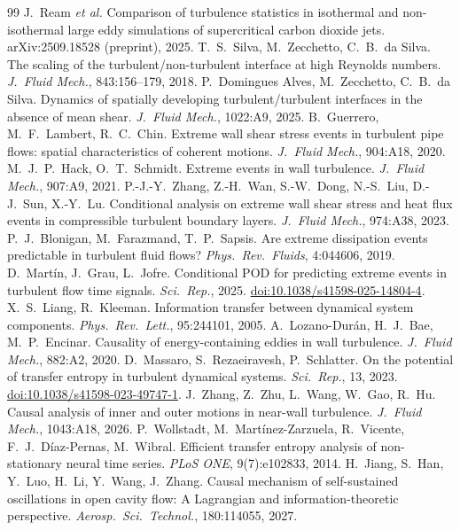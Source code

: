 \documentclass[11pt]{article}
\begin{document}
\begin{thebibliography}{99}
 J.\ Ream \emph{et al.} Comparison of turbulence statistics in isothermal and non-isothermal large eddy simulations of supercritical carbon dioxide jets. arXiv:2509.18528 (preprint), 2025.
 T.\ S.\ Silva, M.\ Zecchetto, C.\ B.\ da Silva. The scaling of the turbulent/non-turbulent interface at high Reynolds numbers. \emph{J.\ Fluid Mech.}, 843:156--179, 2018.
 P.\ Domingues Alves, M.\ Zecchetto, C.\ B.\ da Silva. Dynamics of spatially developing turbulent/turbulent interfaces in the absence of mean shear. \emph{J.\ Fluid Mech.}, 1022:A9, 2025.
 B.\ Guerrero, M.\ F.\ Lambert, R.\ C.\ Chin. Extreme wall shear stress events in turbulent pipe flows: spatial characteristics of coherent motions. \emph{J.\ Fluid Mech.}, 904:A18, 2020.
 M.\ J.\ P.\ Hack, O.\ T.\ Schmidt. Extreme events in wall turbulence. \emph{J.\ Fluid Mech.}, 907:A9, 2021.
 P.-J.-Y.\ Zhang, Z.-H.\ Wan, S.-W.\ Dong, N.-S.\ Liu, D.-J.\ Sun, X.-Y.\ Lu. Conditional analysis on extreme wall shear stress and heat flux events in compressible turbulent boundary layers. \emph{J.\ Fluid Mech.}, 974:A38, 2023.
 P.\ J.\ Blonigan, M.\ Farazmand, T.\ P.\ Sapsis. Are extreme dissipation events predictable in turbulent fluid flows? \emph{Phys.\ Rev.\ Fluids}, 4:044606, 2019.
 D.\ Mart\'in, J.\ Grau, L.\ Jofre. Conditional POD for predicting extreme events in turbulent flow time signals. \emph{Sci.\ Rep.}, 2025. \href{https://doi.org/10.1038/s41598-025-14804-4}{doi:10.1038/s41598-025-14804-4}.
 X.\ S.\ Liang, R.\ Kleeman. Information transfer between dynamical system components. \emph{Phys.\ Rev.\ Lett.}, 95:244101, 2005.
 A.\ Lozano-Dur\'an, H.\ J.\ Bae, M.\ P.\ Encinar. Causality of energy-containing eddies in wall turbulence. \emph{J.\ Fluid Mech.}, 882:A2, 2020.
 D.\ Massaro, S.\ Rezaeiravesh, P.\ Schlatter. On the potential of transfer entropy in turbulent dynamical systems. \emph{Sci.\ Rep.}, 13, 2023. \href{https://doi.org/10.1038/s41598-023-49747-1}{doi:10.1038/s41598-023-49747-1}.
 J.\ Zhang, Z.\ Zhu, L.\ Wang, W.\ Gao, R.\ Hu. Causal analysis of inner and outer motions in near-wall turbulence. \emph{J.\ Fluid Mech.}, 1043:A18, 2026.
 P.\ Wollstadt, M.\ Mart\'inez-Zarzuela, R.\ Vicente, F.\ J.\ D\'iaz-Pernas, M.\ Wibral. Efficient transfer entropy analysis of non-stationary neural time series. \emph{PLoS ONE}, 9(7):e102833, 2014.
 H.\ Jiang, S.\ Han, Y.\ Luo, H.\ Li, Y.\ Wang, J.\ Zhang. Causal mechanism of self-sustained oscillations in open cavity flow: A Lagrangian and information-theoretic perspective. \emph{Aerosp.\ Sci.\ Technol.}, 180:114055, 2027.

\end{thebibliography}
\end{document}
